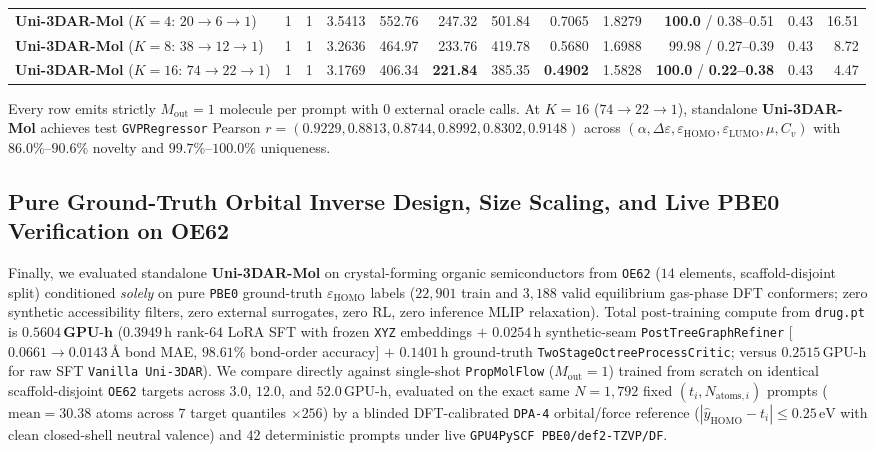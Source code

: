 \documentclass[11pt,a4paper]{article}
\begin{document}
\begin{table}[!t]
{\begin{tabular}{@{}lccrrrrrrrrr@{}}
    \textbf{Uni-3DAR-Mol} ($K=4$: $20\to 6\to 1$) & 1 & 1 & 3.5413 & 552.76 & 247.32 & 501.84 & 0.7065 & 1.8279 & \textbf{100.0} / 0.38--0.51 & 0.43 & 16.51 \\
    \textbf{Uni-3DAR-Mol} ($K=8$: $38\to 12\to 1$) & 1 & 1 & 3.2636 & 464.97 & 233.76 & 419.78 & 0.5680 & 1.6988 & 99.98 / 0.27--0.39 & 0.43 & 8.72 \\
    \textbf{Uni-3DAR-Mol} ($K=16$: $74\to 22\to 1$) & 1 & 1 & 3.1769 & 406.34 & \textbf{221.84} & 385.35 & \textbf{0.4902} & 1.5828 & \textbf{100.0} / \textbf{0.22--0.38} & 0.43 & 4.47 \\
    \bottomrule
  \end{tabular}%
  }
  \vspace{2pt}\par{\scriptsize Every row emits strictly $M_{\text{out}} = 1$ molecule per prompt with $0$ external oracle calls. At $K=16$ ($74\to 22\to 1$), standalone \textbf{Uni-3DAR-Mol} achieves test \texttt{GVPRegressor} Pearson $r = (0.9229, 0.8813, 0.8744, 0.8992, 0.8302, 0.9148)$ across $(\alpha, \Delta\varepsilon, \varepsilon_{\text{HOMO}}, \varepsilon_{\text{LUMO}}, \mu, C_v)$ with $86.0\%\text{--}90.6\%$ novelty and $99.7\%\text{--}100.0\%$ uniqueness.}
\end{table}

\subsection{Pure Ground-Truth Orbital Inverse Design, Size Scaling, and Live PBE0 Verification on OE62}
\label{sec:exp_oe62}

Finally, we evaluated standalone \textbf{Uni-3DAR-Mol} on crystal-forming organic semiconductors from \texttt{OE62} \citep{stuke2020oe62} ($14$ elements, scaffold-disjoint split) conditioned \emph{solely} on pure \texttt{PBE0} ground-truth $\varepsilon_{\text{HOMO}}$ labels ($22{,}901$ train and $3{,}188$ valid equilibrium gas-phase DFT conformers; zero synthetic accessibility filters, zero external surrogates, zero RL, zero inference MLIP relaxation). Total post-training compute from \texttt{drug.pt} is $\mathbf{0.5604\,\text{GPU-h}}$ ($0.3949\,\text{h}$ rank-$64$ LoRA SFT with frozen \texttt{XYZ} embeddings $+$ $0.0254\,\text{h}$ synthetic-seam \texttt{PostTree\allowbreak Graph\allowbreak Refiner} [$0.0661 \to \mathbf{0.0143\,\text{\AA}}$ bond MAE, $\mathbf{98.61\%}$ bond-order accuracy] $+$ $0.1401\,\text{h}$ ground-truth \texttt{TwoStage\allowbreak Octree\allowbreak ProcessCritic}; versus $0.2515\,\text{GPU-h}$ for raw SFT \texttt{Vanilla Uni-3DAR}). We compare directly against single-shot \texttt{PropMolFlow} ($M_{\text{out}}=1$) trained from scratch on identical scaffold-disjoint \texttt{OE62} targets across $3.0$, $12.0$, and $52.0\,\text{GPU-h}$, evaluated on the exact same $N=1{,}792$ fixed $(t_i, N_{\text{atoms},i})$ prompts ($\text{mean}=30.38$ atoms across $7$ target quantiles $\times 256$) by a blinded DFT-calibrated \texttt{DPA-4} orbital/force reference ($|\hat{y}_{\text{HOMO}} - t_i| \le 0.25\,\text{eV}$ with clean closed-shell neutral valence) and $42$ deterministic prompts under live \texttt{GPU4PySCF PBE0/def2-TZVP/DF}.
\end{document}
